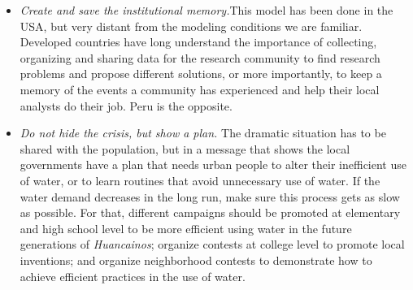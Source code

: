 \documentclass[doc,12pt,floatsintext]{apa7}
\begin{document}
\begin{itemize}
\item \emph{Create and save the institutional memory.}This model has been done in the USA, but very distant from the modeling conditions we are familiar. Developed countries have long understand the importance of collecting, organizing and sharing data for the research community to find research problems and propose different solutions, or more importantly, to keep a memory of the events a community has experienced and help their local analysts do their job. Peru is the opposite.

\item \emph{Do not hide the crisis, but show a plan.} The dramatic situation has to be shared with the population, but in a message that shows the local governments have a plan that needs urban people to alter their inefficient use of water, or to learn routines that avoid unnecessary use of water. If the water demand decreases in the long run, make sure this process gets as slow as possible. For that, different campaigns should be promoted at elementary and high school level to be more efficient using water in the future generations of \emph{Huancainos}; organize contests at college level to promote local inventions; and organize neighborhood contests to demonstrate how to achieve efficient practices in the use of water.


\end{itemize}
\end{document}

